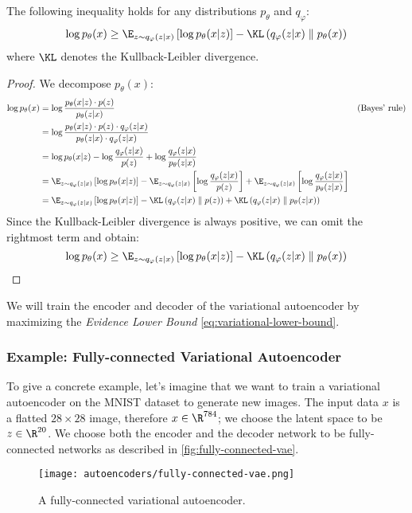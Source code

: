 \begin{property}
    The following inequality holds for any distributions $p_\theta$ and $q_\varphi$:
    \begin{equation}
        \label{eq:variational-lower-bound}
        \log p_\theta(x) \geq \E_{z\sim q_\varphi(z|x)}\left[\log p_\theta(x|z)\right] - \KL\left(q_\varphi(z|x)\parallel p_\theta(x)\right)
    \end{equation}
    where $\KL$ denotes the Kullback-Leibler divergence.
\end{property}
\begin{proof}
    We decompose $p_\theta(x)$:
    \begin{align*}
        \log p_\theta(x) &= \log\frac{p_\theta(x|z)\cdot p(z)}{p_\theta(z|x)} && \text{(Bayes' rule)} \\
        &= \log\frac{p_\theta(x|z)\cdot p(z)\cdot q_\varphi(z|x)}{p_\theta(z|x)\cdot q_\varphi(z|x)} \\
        &= \log p_\theta(x|z) - \log\frac{q_\varphi(z|x)}{p(z)} + \log\frac{q_\varphi(z|x)}{p_\theta(z|x)} \\
        &= \E_{z\sim q_\varphi(z|x)}\left[\log p_\theta(x|z)\right] - \E_{z\sim q_\varphi(z|x)}\left[\log\frac{q_\varphi(z|x)}{p(z)}\right] + \E_{z\sim q_\varphi(z|x)}\left[\log\frac{q_\varphi(z|x)}{p_\theta(z|x)}\right] \\
        &= \E_{z\sim q_\varphi(z|x)}\left[\log p_\theta(x|z)\right] - \KL\left(q_\varphi(z|x)\parallel p(z)\right) + \KL\left(q_\varphi(z|x)\parallel p_\theta(z|x)\right)
    \end{align*}
    Since the Kullback-Leibler divergence is always positive, we can omit the rightmost term and obtain:
    \begin{equation*}
        \log p_\theta(x) \geq \E_{z\sim q_\varphi(z|x)}\left[\log p_\theta(x|z)\right] - \KL\left(q_\varphi(z|x)\parallel p_\theta(x)\right)
    \end{equation*}
\end{proof}

We will train the encoder and decoder of the variational autoencoder by maximizing the \emph{Evidence Lower Bound} \autoref{eq:variational-lower-bound}.

\subsubsection{Example: Fully-connected Variational Autoencoder}
To give a concrete example, let's imagine that we want to train a variational autoencoder on the MNIST dataset to generate new images. The input data $x$ is a flatted $28\times28$ image, therefore $x\in\R^{784}$; we choose the latent space to be $z\in\R^{20}$. We choose both the encoder and the decoder network to be fully-connected networks as described in \autoref{fig:fully-connected-vae}.
\begin{figure}[H]
    \centering
    \texttt{[image: autoencoders/fully-connected-vae.png]}
    \caption{A fully-connected variational autoencoder.}
    \label{fig:fully-connected-vae}
\end{figure}


